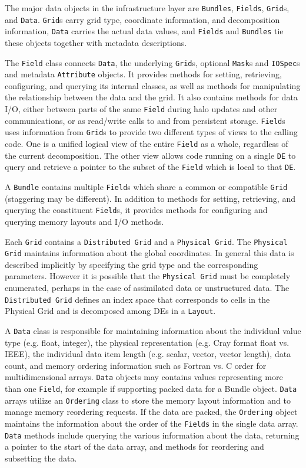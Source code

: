 The major data objects in the infrastructure layer are {\tt Bundles},
{\tt Fields}, {\tt Grid}s, and {\tt Data}.
{\tt Grid}s carry grid type, coordinate information,
and decomposition information, {\tt Data} carries the actual
data values, and {\tt Fields} and {\tt Bundles} tie these objects 
together with metadata descriptions.

The {\tt Field} class connects {\tt Data}, the underlying
{\tt Grid}s, optional {\tt Mask}s and {\tt IOSpec}s and metadata 
{\tt Attribute} objects.  It provides methods
for setting, retrieving, configuring, and querying its internal classes,
as well as methods for manipulating the relationship between the
data and the grid.  It also contains methods for data I/O, either
between parts of the same {\tt Field} during halo updates and other
communications, or as 
read/write calls to and from persistent storage.
{\tt Field}s uses information from {\tt Grid}s to provide
two different types of views to the calling code.
One is a unified logical view of the entire {\tt Field} as a whole,
regardless of the current decomposition.  The other view allows code
running on a single {\tt DE} to query and retrieve a pointer 
to the subset of the {\tt Field} which is local to that {\tt DE}.

A {\tt Bundle} contains multiple {\tt Field}s which share a
common or compatible {\tt Grid} (staggering may be different).  In 
addition to methods for
setting, retrieving, and querying the constituent {\tt Field}s, it provides
methods for configuring and querying memory layouts and I/O methods.

Each {\tt Grid} contains a {\tt Distributed Grid} and a 
{\tt Physical Grid}.  The {\tt Physical Grid} maintains
information about the global coordinates.  In general this data
is described implicitly by specifying the grid type and the
corresponding parameters.  However it is possible that the
{\tt Physical Grid} must be completely enumerated, perhaps in the
case of assimilated data or unstructured data.
The {\tt Distributed Grid} defines an index space that corresponds to
cells in the Physical Grid and is decomposed among {DE}s in a 
{\tt Layout}.  

A {\tt Data} class is responsible for maintaining
information about the individual value type (e.g. float, integer), 
the physical representation (e.g. Cray format float vs. IEEE), the 
individual data item length (e.g. scalar, vector, vector length), 
data count, and memory ordering information such as Fortran vs. C order 
for multidimensional arrays.  {\tt Data} objects may contains values 
representing more than one {\tt Field}, for example if supporting
packed data for a Bundle object.
{\tt Data} arrays utilize an {\tt Ordering} class to store the
memory layout information and to manage memory reordering requests.
If the data are packed, the {\tt Ordering} object maintains the information
about the order of the {\tt Fields} in the single data array.
{\tt Data} methods include querying the various information about the
data, returning a pointer to the start of the data
array, and methods for reordering and subsetting the data.

